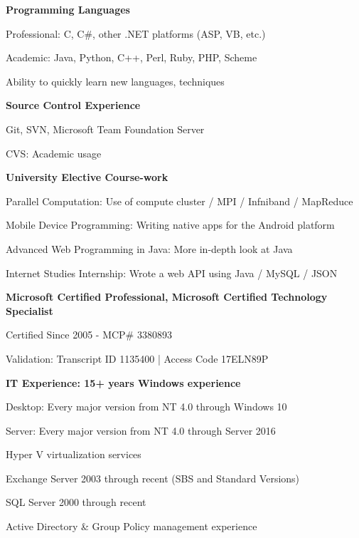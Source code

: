 \documentclass[10pt]{article}
\begin{document}
\begin{innerlist}
  \item[] \textbf{Programming Languages}
  \begin{innerlist}
    \item Professional: C, C\#, other .NET platforms (ASP, VB, etc.)
    \item Academic: Java, Python, C++, Perl, Ruby, PHP, Scheme
    \item Ability to quickly learn new languages, techniques
  \end{innerlist}

  \item[] \textbf{Source Control Experience}
  \begin{innerlist}
    \item Git, SVN, Microsoft Team Foundation Server
    \item CVS: Academic usage
  \end{innerlist}
  
  \item[] \textbf{University Elective Course-work}
  \begin{innerlist}
    \item Parallel Computation: Use of compute cluster / MPI / Infniband / MapReduce
    \item Mobile Device Programming: Writing native apps for the Android platform
    \item Advanced Web Programming in Java: More in-depth look at Java
    \item Internet Studies Internship: Wrote a web API using Java / MySQL / JSON
  \end{innerlist}

  \item[] \textbf{Microsoft Certified Professional, Microsoft Certified Technology Specialist}
  \begin{innerlist}
    \item Certified Since 2005 - MCP\# 3380893
    \item Validation: Transcript ID 1135400 | Access Code 17ELN89P
  \end{innerlist}

  \item[] \textbf{IT Experience: 15+ years Windows experience}
  \begin{innerlist}
    \item Desktop: Every major version from NT 4.0 through Windows 10
    \item Server: Every major version from NT 4.0 through Server 2016
    \item Hyper V virtualization services
    \item Exchange Server 2003 through recent (SBS and Standard Versions)
    \item SQL Server 2000 through recent
	\item Active Directory \& Group Policy management experience
  \end{innerlist}


\end{innerlist}
\end{document}
